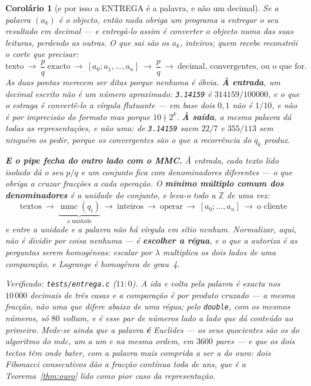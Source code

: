 \documentclass[11pt,a4paper]{article}
\newcommand{\code}[1]{\texttt{\small #1}}
\newtheorem{corolario}[teorema]{Corolário}
\begin{document}
\begin{corolario}[e por isso a ENTREGA é a palavra, e não um
decimal]\label{cor:entrega}
Se a palavra $(a_k)$ \emph{é} o objecto, então nada obriga um programa a
entregar o seu resultado em decimal --- e entregá-lo assim é converter o
objecto numa das suas leituras, perdendo as outras. O que sai são os
$a_k$, inteiros; quem recebe reconstrói o corte que precisar:
\[
\text{texto}\ \longrightarrow\ \frac{p}{q}\ \text{exacto}\ \longrightarrow\
[a_0;a_1,\ldots,a_n]\ \longrightarrow\ \frac{p}{q}\ \longrightarrow\
\text{decimal, convergentes, ou o que for.}
\]
As duas pontas merecem ser ditas porque nenhuma é óbvia. \textbf{À entrada},
um decimal escrito não é um número aproximado: \code{3.14159} \emph{é}
$314159/100000$, e o que o estraga é convertê-lo a vírgula flutuante --- em
base dois $0{,}1$ não é $1/10$, e não é por imprecisão do formato mas porque
$10\nmid 2^k$. \textbf{À saída}, a mesma palavra dá \emph{todas} as
representações, e não uma: de \code{3.14159} saem $22/7$ e $355/113$ sem
ninguém os pedir, porque os convergentes são o que a recorrência do
$q_k$ produz.

\textbf{E o pipe fecha do outro lado com o MMC.} À entrada, cada texto lido isolado dá o
seu $p/q$ e um conjunto fica com denominadores diferentes --- o que obriga a cruzar
fracções a cada operação. O \textbf{mínimo múltiplo comum dos denominadores} é a
\emph{unidade} do conjunto, e leva-o todo a $\mathbb{Z}$ de uma vez:
\[
\text{textos}\ \longrightarrow\ \underbrace{\operatorname{mmc}(q_i)}_{\text{a unidade}}\
\longrightarrow\ \text{inteiros}\ \longrightarrow\ \text{operar}\ \longrightarrow\
[a_0;\ldots,a_n]\ \longrightarrow\ \text{o cliente}
\]
\emph{e entre a unidade e a palavra não há vírgula em sítio nenhum}. Normalizar, aqui, não
é dividir por coisa nenhuma --- é \textbf{escolher a régua}, e o que a autoriza é as
perguntas serem homogéneas: escalar por $\lambda$ multiplica os dois lados de uma
comparação, e Lagrange é homogénea de grau~4.

\emph{Verificado:} \code{tests/entrega.c} ($11{:}0$). A ida e volta pela
palavra é exacta nos $10\,000$ decimais de três casas e a comparação é por
produto cruzado --- a \emph{mesma} fracção, não uma que difere abaixo de uma
régua; pelo \code{double}, com os mesmos números, só $80$ voltam, e
é esse par de números lado a lado que dá conteúdo ao primeiro. Mede-se
ainda que a palavra \textbf{é} Euclides --- os seus quocientes são os do
algoritmo do mdc, um a um e na mesma ordem, em $3600$ pares --- e que os
dois tectos têm onde bater, com a palavra mais comprida a ser a do ouro:
dois Fibonacci consecutivos dão a fracção contínua toda de uns, que é a
Teorema~\ref{thm:ouro} lido como \emph{pior caso da representação}.
\end{corolario}
\end{document}
